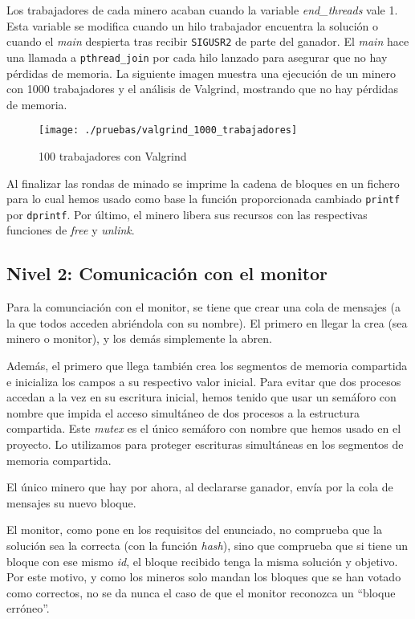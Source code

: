\documentclass{article}
\begin{document}
    Los trabajadores de cada minero acaban cuando la variable \textit{end\_threads} vale 1. Esta variable se modifica cuando un hilo trabajador encuentra la solución o cuando el \textit{main} despierta tras recibir \texttt{SIGUSR2} de parte del ganador. El \textit{main} hace una llamada a \texttt{pthread\_join} por cada hilo lanzado para asegurar que no hay pérdidas de memoria. La siguiente imagen muestra una ejecución de un minero con 1000 trabajadores y el análisis de Valgrind, mostrando que no hay pérdidas de memoria.

    \begin{figure}[h!]
        \centering
        \texttt{[image: ./pruebas/valgrind\_1000\_trabajadores]}
        \caption{100 trabajadores con Valgrind}
    \end{figure}

    Al finalizar las rondas de minado se imprime la cadena de bloques en un fichero para lo cual hemos usado como base la función proporcionada cambiado \texttt{printf} por \texttt{dprintf}. Por último, el minero libera sus recursos con las respectivas funciones de \textit{free} y \textit{unlink}.
    

\subsection*{Nivel 2: Comunicación con el monitor}

    Para la comunciación con el monitor, se tiene que crear una cola de mensajes (a la que todos acceden abriéndola con su nombre). El primero en llegar la crea (sea minero o monitor), y los demás simplemente la abren.
    
    Además, el primero que llega también crea los segmentos de memoria compartida e inicializa los campos a su respectivo valor inicial. Para evitar que dos procesos accedan a la vez en su escritura inicial, hemos tenido que usar un semáforo con nombre que impida el acceso simultáneo de dos procesos a la estructura compartida.
    Este \textit{mutex} es el único semáforo con nombre que hemos usado en el proyecto. Lo utilizamos para proteger escrituras simultáneas en los segmentos de memoria compartida.

    El único minero que hay por ahora, al declararse ganador, envía por la cola de mensajes su nuevo bloque.

    El monitor, como pone en los requisitos del enunciado, no comprueba que la solución sea la correcta (con la función \emph{hash}), sino que comprueba que si tiene un bloque con ese mismo \emph{id}, el bloque recibido tenga la misma solución y objetivo. Por este motivo, y como los mineros solo mandan los bloques que se han votado como correctos, no se da nunca el caso de que el monitor reconozca un ``bloque erróneo''.
\end{document}
